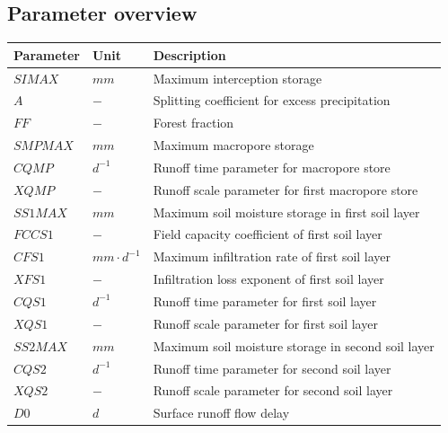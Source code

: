 \subsection{Parameter overview}
\begin{table}[htbp]
  \centering
    \begin{tabular}{lll}
    \toprule
    Parameter & Unit  & Description \\
    \midrule
    $SIMAX$ & $mm$   & Maximum interception storage \\
    $A$ & $-$   & Splitting coefficient for excess precipitation \\
    $FF$ & $-$  & Forest fraction \\
    $SMPMAX$ & $mm$ & Maximum macropore storage \\
    $CQMP$ & $d^{-1}$   & Runoff time parameter for macropore store \\
    $XQMP$ & $-$   & Runoff scale parameter for first macropore store \\
    $SS1MAX$ & $mm$   & Maximum soil moisture storage in first soil layer\\
    $FCCS1$ & $-$  & Field capacity coefficient of first soil layer \\
    $CFS1$ & $mm\cdot d^{-1}$   & Maximum infiltration rate of first soil layer \\
    $XFS1$ & $-$ & Infiltration loss exponent of first soil layer \\
    $CQS1$ & $d^{-1}$ & Runoff time parameter for first soil layer \\
    $XQS1$ & $-$ &  Runoff scale parameter for first soil layer\\
    $SS2MAX$ & $mm$ &  Maximum soil moisture storage in second soil layer\\
    $CQS2$ & $d^{-1}$ & Runoff time parameter for second soil layer \\
    $XQS2$ & $-$ &  Runoff scale parameter for second soil layer \\
    $D0$ & $d$ & Surface runoff flow delay \\
    \bottomrule
    \end{tabular}%
  \label{tab:addlabel}%
\end{table}%
